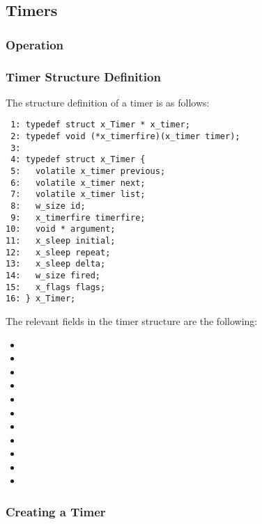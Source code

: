 %
%

\subsection{Timers}

\subsubsection{Operation}

\subsubsection{Timer Structure Definition}

The structure definition of a timer is as follows:

\bcode
\begin{verbatim}
 1: typedef struct x_Timer * x_timer;
 2: typedef void (*x_timerfire)(x_timer timer);
 3:
 4: typedef struct x_Timer {
 5:   volatile x_timer previous;
 6:   volatile x_timer next;
 7:   volatile x_timer list;
 8:   w_size id;
 9:   x_timerfire timerfire;
10:   void * argument;
11:   x_sleep initial;
12:   x_sleep repeat;
13:   x_sleep delta;
14:   w_size fired;
15:   x_flags flags;
16: } x_Timer;
\end{verbatim}
\ecode

The relevant fields in the timer structure are the following:

\begin{itemize}
\item {}
\item {}
\item {}
\item {}
\item {}
\item {}
\item {}
\item {}
\item {}
\item {}
\item {}
\end{itemize}

\subsubsection{Creating a Timer}

